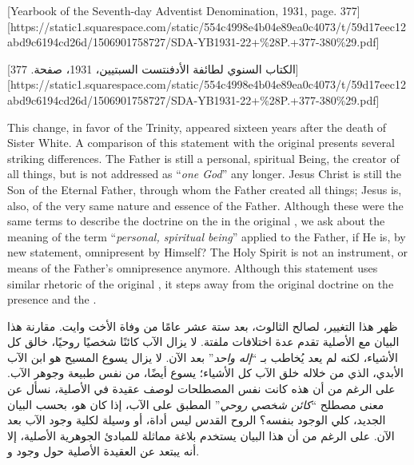 

[Yearbook of the Seventh-day Adventist Denomination, 1931, page. 377][https://static1.squarespace.com/static/554c4998e4b04e89ea0c4073/t/59d17eec12abd9c6194cd26d/1506901758727/SDA-YB1931-22+\%28P.+377-380\%29.pdf]


[الكتاب السنوي لطائفة الأدفنتست السبتيين، 1931، صفحة. 377][https://static1.squarespace.com/static/554c4998e4b04e89ea0c4073/t/59d17eec12abd9c6194cd26d/1506901758727/SDA-YB1931-22+\%28P.+377-380\%29.pdf]


This change, in favor of the Trinity, appeared sixteen years after the death of Sister White. A comparison of this statement with the original  presents several striking differences. The Father is still a personal, spiritual Being, the creator of all things, but is not addressed as “\textit{one God}” any longer. Jesus Christ is still the Son of the Eternal Father, through whom the Father created all things; Jesus is, also, of the very same nature and essence of the Father. Although these were the same terms to describe the doctrine on the  in the original , we ask about the meaning of the term “\textit{personal, spiritual being}” applied to the Father, if He is, by new statement, omnipresent by Himself? The Holy Spirit is not an instrument, or means of the Father’s omnipresence anymore. Although this statement uses similar rhetoric of the original , it steps away from the original doctrine on the presence and the .


ظهر هذا التغيير، لصالح الثالوث، بعد ستة عشر عامًا من وفاة الأخت وايت. مقارنة هذا البيان مع  الأصلية تقدم عدة اختلافات ملفتة. لا يزال الآب كائنًا شخصيًا روحيًا، خالق كل الأشياء، لكنه لم يعد يُخاطب بـ “\textit{إله واحد}” بعد الآن. لا يزال يسوع المسيح هو ابن الآب الأبدي، الذي من خلاله خلق الآب كل الأشياء؛ يسوع أيضًا، من نفس طبيعة وجوهر الآب. على الرغم من أن هذه كانت نفس المصطلحات لوصف عقيدة  في  الأصلية، نسأل عن معنى مصطلح “\textit{كائن شخصي روحي}” المطبق على الآب، إذا كان هو، بحسب البيان الجديد، كلي الوجود بنفسه؟ الروح القدس ليس أداة، أو وسيلة لكلية وجود الآب بعد الآن. على الرغم من أن هذا البيان يستخدم بلاغة مماثلة للمبادئ الجوهرية الأصلية، إلا أنه يبتعد عن العقيدة الأصلية حول وجود و.



